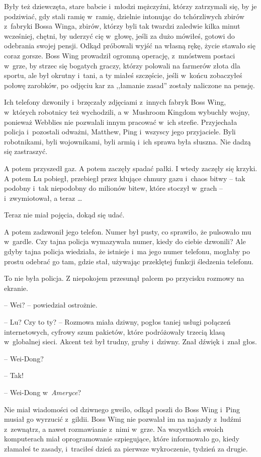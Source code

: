 \documentclass[oneside,polish,11pt,rmheadings]{mwbk}
\begin{document}
Były też dziewczęta, stare babcie i~młodzi mężczyźni, którzy zatrzymali się, by je podziwiać, gdy stali ramię w~ramię, dzielnie intonując do tchórzliwych zbirów z~fabryki Bossa Winga, zbirów, którzy byli tak twardzi zaledwie kilka minut wcześniej, chętni, by uderzyć cię w~głowę, jeśli za dużo mówiłeś, gotowi do odebrania swojej pensji. Odkąd próbowali wyjść na własną rękę, życie stawało się coraz gorsze. Boss Wing prowadził ogromną operację, z~mnóstwem postaci w~grze, by strzec się bogatych graczy, którzy polowali na farmerów złota dla sportu, ale był okrutny i~tani, a ty miałeś szczęście, jeśli w~końcu zobaczyłeś połowę zarobków, po odjęciu kar za ,,łamanie zasad'' zostały naliczone na pensję.

Ich telefony dzwoniły i~brzęczały zdjęciami z~innych fabryk Boss Wing, w~których robotnicy też wychodzili, a w~Mushroom Kingdom wybuchły wojny, ponieważ Webblies nie pozwalali innym pracować w~ich strefie. Przyjechała policja i~pozostali odważni, Matthew, Ping i~wszyscy jego przyjaciele. Byli robotnikami, byli wojownikami, byli armią i~ich sprawa była słuszna. Nie dadzą się zastraszyć.

A potem przyszedł gaz. A potem zaczęły spadać pałki. I wtedy zaczęły się krzyki. A potem Lu pobiegł, przebiegł przez kłujące chmury gazu i~chaos bitwy -- tak podobny i~tak niepodobny do milionów bitew, które stoczył w~grach -- i~zwymiotował, a teraz \ldots 

Teraz nie miał pojęcia, dokąd się udać.

A potem zadzwonił jego telefon. Numer był pusty, co sprawiło, że pulsowało mu w~gardle. Czy tajna policja wymazywała numer, kiedy do ciebie dzwonili? Ale gdyby tajna policja wiedziała, że istnieje i~ma jego numer telefonu, mogłaby po prostu odebrać go tam, gdzie stał, używając przeklętej funkcji śledzenia telefonu.

To nie była policja. Z niepokojem przesunął palcem po przycisku rozmowy na ekranie.

-- Wei? -- powiedział ostrożnie.

-- Lu? Czy to ty? -- Rozmowa miała dziwny, pogłos taniej usługi połączeń internetowych, cyfrowy szum pakietów, które podróżowały trzecią klasą w~globalnej sieci. Akcent też był trudny, gruby i~dziwny. Znał dźwięk i~znał głos.

-- Wei-Dong?

-- Tak!

-- Wei-Dong w~\textit{Ameryce}? 

Nie miał wiadomości od dziwnego gweilo, odkąd poszli do Boss Wing i~Ping musiał go wyrzucić z~gildii. Boss Wing nie pozwalał im na najazdy z~ludźmi z~zewnątrz, a nawet rozmawianie z~nimi w~grze. Na wszystkich swoich komputerach miał oprogramowanie szpiegujące, które informowało go, kiedy złamałeś te zasady, i~traciłeś dzień za pierwsze wykroczenie, tydzień za drugie.
\end{document}
